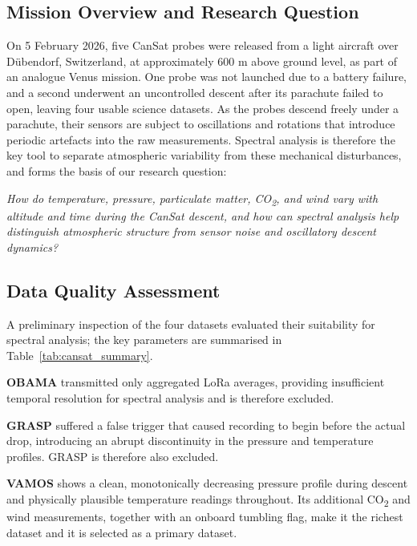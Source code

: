\subsection{Mission Overview and Research Question}
On 5 February 2026, five CanSat probes were released from a light aircraft over Dübendorf, Switzerland, at approximately 600 m above ground level, as part of an analogue Venus mission. One probe was not launched due to a battery failure, and a second underwent an uncontrolled descent after its parachute failed to open, leaving four usable science datasets. As the probes descend freely under a parachute, their sensors are subject to oscillations and rotations that introduce periodic artefacts into the raw measurements. Spectral analysis is therefore the key tool to separate atmospheric variability from these mechanical disturbances, and forms the basis of our research question:

\begin{tcolorbox}[
    colback=gray!10,
    colframe=gray!50,
    boxrule=0.8pt,
    arc=4pt,
    left=8pt, right=8pt, top=6pt, bottom=6pt
]
\textit{How do temperature, pressure, particulate matter, CO\textsubscript{2}, and wind vary with altitude and time during the CanSat descent, and how can spectral analysis help distinguish atmospheric structure from sensor noise and oscillatory descent dynamics?}
\end{tcolorbox}


\subsection{Data Quality Assessment}
A preliminary inspection of the four datasets evaluated their suitability for spectral analysis; the key parameters are summarised in Table~\ref{tab:cansat_summary}.

\textbf{OBAMA} transmitted only aggregated LoRa averages, providing insufficient temporal resolution for spectral analysis and is therefore excluded.

\textbf{GRASP} suffered a false trigger that caused recording to begin before the actual drop, introducing an abrupt discontinuity in the pressure and temperature profiles. GRASP is therefore also excluded.

\textbf{VAMOS} shows a clean, monotonically decreasing pressure profile during descent and physically plausible temperature readings throughout. Its additional CO\textsubscript{2} and wind measurements, together with an onboard tumbling flag, make it the richest dataset and it is selected as a primary dataset.

